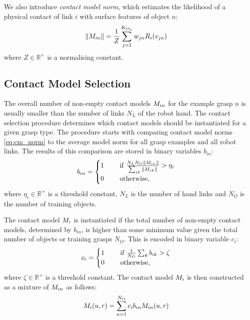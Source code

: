 We also introduce \textit{contact model norm}, which estimates the likelihood of a physical contact of link $i$ with surface features of object $n$:
\begin{equation}\label{eq:cm_norm}
\|M_{in}\| = \frac 1Z \sum_{j=1}^{K_{O_n}} w_{jn} R_{i}(v_{jn})
\end{equation}
where $Z \in \mathbb R^+$ is a normalising constant.

\subsection{Contact Model Selection}

The overall number of non-empty contact models $M_{in}$ for the example grasp $n$ is usually smaller than the number of links $N_L$ of the robot hand. The contact selection procedure determines which contact models should be instantiated for a given grasp type. The procedure starts with comparing contact model norms \eqref{eq:cm_norm} to the average model norm for all grasp examples and all robot links. The results of this comparison are stored in binary variables $b_{in}$:
\begin{equation}
b_{in} = \begin{cases} 1 \quad &\textnormal{ if } \frac{N_L N_O \|M_{in}\|}{\sum_{jk}\|M_{jk}\|} > \eta_i \\
0 \quad &\textnormal{ otherwise},\end{cases}
\label{eq:cm_n_binary}
\end{equation}
where $\eta_i \in \mathbb{R}^+$ is a threshold constant, $N_L$ is the number of hand links and $N_O$ is the number of training objects.

The contact model $M_i$ is instantiated if the total number of non-empty contact models, determined by $b_{in}$, is higher than some minimum value given the total number of objects or training grasps $N_O$. This is encoded in binary variable $c_i$:
\begin{equation}
c_i = \begin{cases} 1 \quad &\textnormal{ if } \frac{1}{N_O} \sum_k b_{ik} > \zeta\\
0 \quad &\textnormal{ otherwise},\end{cases}
\label{eq:cm_binary}
\end{equation}
where $\zeta \in \mathbb{R}^+$ is a threshold constant. The contact model $M_i$ is then constructed as a mixture of $M_{in}$ as follows:
\begin{equation}\label{eq:cm}
M_{i}(u, r) = \sum_{n=1}^{N_O} c_{i} b_{in} M_{in}(u, r)
\end{equation}

